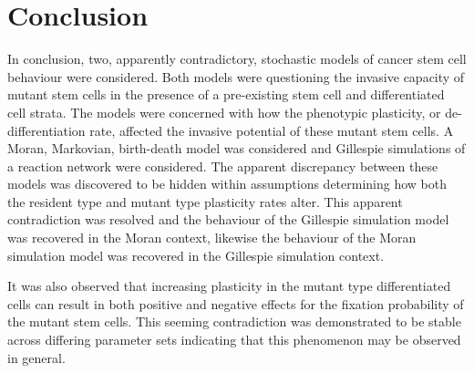 \documentclass[12pt]{article}
\begin{document}
\section{Conclusion}
In conclusion, two, apparently contradictory, stochastic models of cancer stem cell behaviour were considered. Both models were questioning the invasive capacity of mutant stem cells in the presence of a pre-existing stem cell and differentiated cell strata. The models were concerned with how the phenotypic plasticity, or de-differentiation rate, affected the invasive potential of these mutant stem cells. A Moran, Markovian, birth-death model was considered and Gillespie simulations of a reaction network were considered. The apparent discrepancy between these models was discovered to be hidden within assumptions determining how both the resident type and mutant type plasticity rates alter. This apparent contradiction was resolved and the behaviour of the Gillespie simulation model was recovered in the Moran context, likewise the behaviour of the Moran simulation model was recovered in the Gillespie simulation context.

It was also observed that increasing plasticity in the mutant type differentiated cells can result in both positive and negative effects for the fixation probability of the mutant stem cells. This seeming contradiction was demonstrated to be stable across differing parameter sets indicating that this phenomenon may be observed in general. 
\end{document}
